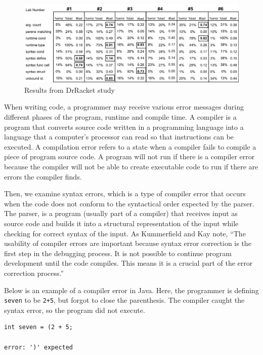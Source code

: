 \documentclass{sig-alternate}
\begin{document}
\begin{figure}
  \centering
  \includegraphics[keepaspectratio, width= 1.0 \textwidth]{MEE-Data.pdf}
  \caption{Results from DrRacket study}
  \label{fig:drracketdata}
\end{figure}

When writing code, a programmer may receive various error messages during different phases of the program, runtime and compile time.
A compiler is a program that converts source code written in a programming language into a language that a computer's processor can read so that instructions can be executed.
A compilation error refers to a state when a compiler fails to compile a piece of  program source code.
A program will not run if there is a compiler error because the compiler will not be able to create executable code to run if there are errors the compiler finds. 

Then, we examine syntax errors, which is a type of compiler error that occurs when the code does not conform to the syntactical order expected by the parser.
The parser, is a program (usually part of a compiler) that receives input as source code and builds it into a structural representation of the input while checking for correct syntax of the input.
As Kummerfield and Kay note, ``The usability of compiler errors are important because syntax error correction is the first step in the debugging process. It is not possible to continue program development until the code compiles. This means it is a crucial part of the error correction process.''~\cite{Kummerfeld:2003:NBF:858403.858416}

Below is an example of a compiler error in Java. Here, the programmer is defining \texttt{seven} to be \texttt{2+5}, but forgot to close the parenthesis. The compiler caught the syntax error, so the program did not execute.

\begin{verbatim}
int seven = (2 + 5;

error: ')' expected
\end{verbatim}
\end{document}
